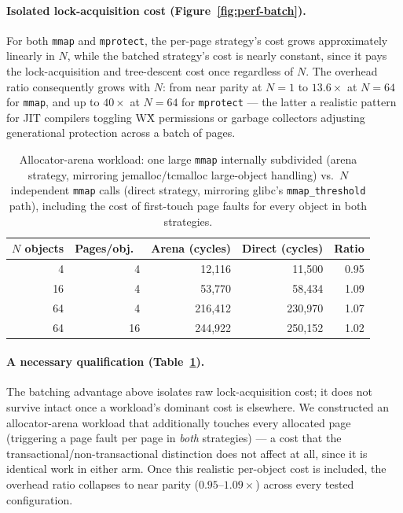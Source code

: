 \documentclass[10pt]{article}
\begin{document}
\paragraph{Isolated lock-acquisition cost (Figure~\ref{fig:perf-batch}).}
For both \texttt{mmap} and \texttt{mprotect}, the per-page strategy's
cost grows approximately linearly in $N$, while the batched strategy's
cost is nearly constant, since it pays the lock-acquisition and
tree-descent cost once regardless of $N$. The overhead ratio
consequently grows with $N$: from near parity at $N{=}1$ to
$13.6\times$ at $N{=}64$ for \texttt{mmap}, and up to $40\times$ at
$N{=}64$ for \texttt{mprotect} --- the latter a realistic pattern for
JIT compilers toggling W\^X permissions or garbage collectors adjusting
generational protection across a batch of pages.

\begin{table}[h]
\centering
\caption{Allocator-arena workload: one large \texttt{mmap} internally
subdivided (arena strategy, mirroring jemalloc/tcmalloc large-object
handling) vs.\ $N$ independent \texttt{mmap} calls (direct strategy,
mirroring glibc's \texttt{mmap\_threshold} path), including the cost of
first-touch page faults for every object in both strategies.}
\label{tab:perf-arena}
\begin{tabular}{@{}rrrrr@{}}
\toprule
$N$ objects & Pages/obj.\ & Arena (cycles) & Direct (cycles) & Ratio \\
\midrule
4  & 4  & 12{,}116  & 11{,}500  & 0.95 \\
16 & 4  & 53{,}770  & 58{,}434  & 1.09 \\
64 & 4  & 216{,}412 & 230{,}970 & 1.07 \\
64 & 16 & 244{,}922 & 250{,}152 & 1.02 \\
\bottomrule
\end{tabular}
\end{table}

\paragraph{A necessary qualification (Table~\ref{tab:perf-arena}).} The
batching advantage above isolates raw lock-acquisition cost; it does not
survive intact once a workload's dominant cost is elsewhere. We
constructed an allocator-arena workload that additionally touches every
allocated page (triggering a page fault per page in \emph{both}
strategies) --- a cost that the transactional/non-transactional
distinction does not affect at all, since it is identical work in either
arm. Once this realistic per-object cost is included, the overhead ratio
collapses to near parity ($0.95$--$1.09\times$) across every tested
configuration.
\end{document}
